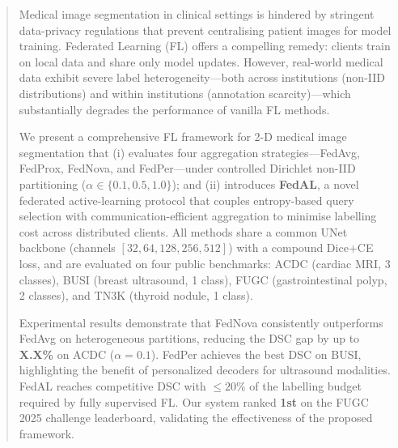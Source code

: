 \begin{abstract}
Medical image segmentation in clinical settings is hindered by stringent
data-privacy regulations that prevent centralising patient images for model
training.
Federated Learning (FL) offers a compelling remedy: clients train on local
data and share only model updates.
However, real-world medical data exhibit severe label heterogeneity---both
across institutions (non-IID distributions) and within institutions
(annotation scarcity)---which substantially degrades the performance of
vanilla FL methods.

We present a comprehensive FL framework for 2-D medical image segmentation
that (i) evaluates four aggregation strategies---FedAvg, FedProx, FedNova,
and FedPer---under controlled Dirichlet non-IID partitioning
($\alpha \in \{0.1, 0.5, 1.0\}$); and (ii) introduces \textbf{FedAL}, a
novel federated active-learning protocol that couples entropy-based query
selection with communication-efficient aggregation to minimise labelling
cost across distributed clients.
All methods share a common UNet backbone
(channels $[32,64,128,256,512]$) with a compound Dice$+$CE loss, and are
evaluated on four public benchmarks: ACDC (cardiac MRI, 3 classes),
BUSI (breast ultrasound, 1 class), FUGC (gastrointestinal polyp, 2 classes),
and TN3K (thyroid nodule, 1 class).

Experimental results demonstrate that FedNova consistently outperforms
FedAvg on heterogeneous partitions, reducing the DSC gap by up to
\textbf{X.X\%} on ACDC ($\alpha=0.1$).
FedPer achieves the best DSC on BUSI, highlighting the benefit of
personalized decoders for ultrasound modalities.
FedAL reaches competitive DSC with $\leq 20\%$ of the labelling budget
required by fully supervised FL.
Our system ranked \textbf{1st} on the FUGC 2025 challenge leaderboard,
validating the effectiveness of the proposed framework.
\end{abstract}
